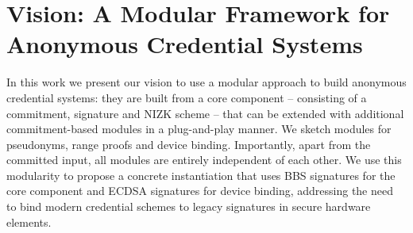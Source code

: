 \documentclass[11pt,oneside]{book}
\theoremstyle{definition}
\theoremstyle{remark}
\theoremstyle{plain}
\begin{document}
\section{\cite{cryptoeprint:2025/1981} Vision: A Modular Framework for Anonymous Credential Systems}
In this work we present our vision to use a modular approach to build anonymous credential systems: they are built from a core component – consisting of a commitment, signature and NIZK scheme – that can be extended with additional commitment-based modules in a plug-and-play manner. We sketch modules for pseudonyms, range proofs and device binding. Importantly, apart from the committed input, all modules are entirely independent of each other. We use this modularity to propose a concrete instantiation that uses BBS signatures for the core component and ECDSA signatures for device binding, addressing the need to bind modern credential schemes to legacy signatures in secure hardware elements.

%
%
\printbibliography
\end{document}
